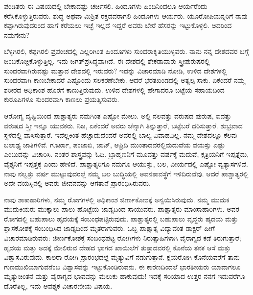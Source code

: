 ಪಂಡಿತರು ಈ ವಿಷಯದಲ್ಲಿ ಬೇಕಾದಷ್ಟು ಚರ್ಚಿಸಲಿ. ಹಿಂದೂಗಳು ಹಿಂದಿನಿಂದಲೂ ಆರ್ಯರೆಂದು ಕರೆಸಿಕೊಳ್ಳುತ್ತಿರುವರು. ಶುದ್ಧ ಅಥವಾ ಮಿಶ್ರಿತ ರಕ್ತದವರಾಗಲಿ ಹಿಂದೂಗಳು ಆರ್ಯರು. ಯೂರೋಪಿಯನ್ನರಿಗೆ ನಾವು ಕಪ್ಪಾಗಿರುವುದರಿಂದ ಹಾಗೆ ಕರೆಯಲು ಇಚ್ಛೆ ಇಲ್ಲದೆ ಇದ್ದರೆ ಅವರು ಬೇರೆ ಹೆಸರನ್ನು ಇಟ್ಟುಕೊಳ್ಳಲಿ. ಅದರಿಂದ ನಮಗೇನು?

ಬೆಳ್ಳಗಿರಲಿ, ಕಪ್ಪಗಿರಲಿ ಪ್ರಪಂಚದಲ್ಲಿ ಎಲ್ಲರಿಗಿಂತ ಹಿಂದೂಗಳು ಸುಂದರಾಕೃತಿಯುಳ್ಳ\break ವರು. ನಾನು ನನ್ನ ದೇಶದವರ ಬಗ್ಗೆ ಜಂಬಕೊಚ್ಚಿಕೊಳ್ಳುತ್ತಿಲ್ಲ. ಇದು ಜಗತ್​ಪ್ರಸಿದ್ಧವಾಗಿದೆ. ಈ ದೇಶದಲ್ಲಿ ಶೇಕಡಾವಾರು ಸ್ತ್ರೀಪುರುಷರಲ್ಲಿ ಸುಂದರವಾಗಿರುವಷ್ಟು ಮತ್ತಾವ ದೇಶದಲ್ಲಿ ಇರುವರು? ಇದನ್ನು ವಿಚಾರಮಾಡಿ ನೋಡಿ, ಉಳಿದ ದೇಶಗಳಲ್ಲಿ ಸುಂದರವಾಗಿ ಕಾಣಬೇಕಾದರೆ ಎಷ್ಟೊಂದು ಸಲಕರಣೆಬೇಕು. ಆದರೆ ಭರತಖಂಡದಲ್ಲಿ ಅತ್ಯಲ್ಪ ಸಾಕು. ಏಕೆಂದರೆ ನಮ್ಮ ಶರೀರದ ಅಧಿಕಾಂಶ ಹೊರಗೆ ಕಾಣುತ್ತಿರುವುದು. ಉಳಿದ ದೇಶಗಳಲ್ಲಿ ಹೇಗಾದರೂ ಬಟ್ಟೆಯ ಸಹಾಯದಿಂದ ಕುರೂಪಿಗಳೂ ಸುಂದರವಾಗಿ ಕಾಣಲು ಪ್ರಯತ್ನಿಸುವರು.

ಆರೋಗ್ಯ ದೃಷ್ಟಿಯಿಂದ ಪಾಶ್ಚಾತ್ಯರು ನಮಗಿಂತ ಎಷ್ಟೋ ಮೇಲು. ಅಲ್ಲಿ ನಲವತ್ತು ವರುಷದ ಪುರುಷ, ಐವತ್ತು ವರುಷದ ಸ್ತ್ರೀ ಇನ್ನೂ ಯುವಕರು. ನಿಜ, ಏಕೆಂದರೆ ಅವರು ಚೆನ್ನಾಗಿ ತಿನ್ನುತ್ತಾರೆ, ಬಟ್ಟೆಬರೆ ಧರಿಸುತ್ತಾರೆ. ಶುಭ್ರವಾದ ಸ್ಥಳದಲ್ಲಿ ವಾಸಿಸುತ್ತಾರೆ. ಇದೆಲ್ಲಕಿಂತ ಹೆಚ್ಚಾದುದೆಂದರೆ ಅವರಲ್ಲಿ ಬಾಲ್ಯ ವಿವಾಹವಿಲ್ಲ. ನಮ್ಮ ದೇಶದಲ್ಲೂ ಕೆಲವು ಬಲಾಢ್ಯ ಜಾತಿಗಳಿವೆ. ಗೂರ್ಖಾ, ಪಂಜಾಬಿ, ಜಾಟ್​, ಆಫ್ರಿದಿ ಮುಂತಾದವರಲ್ಲಿ\break ಮದುವೆಯ ವಯಸ್ಸು ಎಷ್ಟು ಎಂಬುದನ್ನು ವಿಚಾರಿಸಿ. ನಂತರ ಶಾಸ್ತ್ರವನ್ನು ಓದಿ. ಬ್ರಾಹ್ಮಣನಿಗೆ ಮೂವತ್ತು ವರ್ಷಕ್ಕೆ ಮದುವೆ, ಕ್ಷತ್ರಿಯನಿಗೆ ಇಪ್ಪತ್ತೈದು, ವೈಶ್ಯನಿಗೆ ಇಪ್ಪತ್ತಕ್ಕೆ ಎಂದು ಹೇಳಿದೆ. ಪಾಶ್ಚಾತ್ಯರಿಗೂ ನಮಗೂ ಆಯುಸ್ಸು, ಬಲ, ವೀರ್ಯದಲ್ಲಿ ಎಷ್ಟೋ ವ್ಯತ್ಯಾಸಗಳಿವೆ. ನಾವು ನಲ್ವತ್ತು ವರ್ಷ ಮುಟ್ಟುವುದರಲ್ಲೆ ನಮ್ಮ ಬಲ ಬುದ್ಧಿಯಲ್ಲಿ ಅವನತಾವಸ್ಥೆಗೆ ಇಳಿದಿರುವೆವು. ಆದರೆ ಪಾಶ್ಚಾತ್ಯರಲ್ಲಿ ಅದೇ ವಯಸ್ಸಿನಲ್ಲಿ ಅವರು ಜೀವನವನ್ನು ಆಗತಾನೆ ಪ್ರಾರಂಭಿಸಿರುವರು.

ನಾವು ಶಾಕಾಹಾರಿಗಳು, ನಮ್ಮ ರೋಗಗಳಲ್ಲಿ ಅಧಿಕಾಂಶ ಜೀರ್ಣಕೋಶಕ್ಕೆ ಅನ್ವಯಿಸಿರು\break ವುದು. ನಮ್ಮ ಮುದುಕ ಮುದುಕಿಯರು ಮುಕ್ಕಾಲು ಪಾಲು ಹೊಟ್ಟೆಯ ಜಾಡ್ಯದಿಂದ ಸಾಯುವರು. ಪಾಶ್ಚಾತ್ಯರು ಮಾಂಸಾಹಾರಿಗಳು. ಅವರ ರೋಗದಲ್ಲಿ ಬಹುಪಾಲು ಹೃದಯಕ್ಕೆ ಸಂಬಂಧಪಟ್ಟಿರುವುದು. ಪಾಶ್ಚಾತ್ಯರಲ್ಲಿ ಬಹುಪಾಲು ವೃದ್ಧರು ಹೃದಯ ಮತ್ತು ಶ್ವಾಸಕೋಶಕ್ಕೆ ಸಂಬಂಧಿಸಿದ ಜಾಡ್ಯದಿಂದ ಮೃತರಾಗುವರು. ಒಬ್ಬ ಪಾಶ್ಚಾತ್ಯ ವಿದ್ಯಾವಂತ ಡಾಕ್ಟರ್​ ಹೀಗೆ ವಿಚಾರಮಾಡಿರುವರು: ಜೀರ್ಣಕೋಶಕ್ಕೆ ಸಂಬಂಧಪಟ್ಟ ರೋಗಿಗಳು ನಿರುತ್ಸಾಹಿಗಳಾಗಿ ವೈರಾಗ್ಯದ ಕಡೆ ತಿರುಗುತ್ತಾರೆ; ಹೃದಯ ಮತ್ತು ಅದಕ್ಕೆ ಮೇಲಿರುವ ದೇಹದ ಭಾಗದ ಖಾಯಿಲೆಗೆ ತುತ್ತಾದವರಲ್ಲಿ ಕೊನೆಯ ತನಕ ಆಸೆ ಮತ್ತು ವಿಶ್ವಾಸವಿರುವುದು. ಕಾಲರಾ ರೋಗಿ ಪ್ರಾರಂಭದಲ್ಲೆ ಮೃತ್ಯುವಿಗೆ ನಡುಗುತ್ತಾನೆ. ಕ್ಷಯ\break ರೋಗಿ ಕೊನೆಯವರೆಗೆ ತಾನು ಗುಣಮುಖಿಯಾಗುವನೆಂಬ ವಿಶ್ವಾಸವನ್ನು ಇಟ್ಟು\break ಕೊಂಡಿರುವನು. ಈ ಕಾರಣದಿಂದಲೆ ಭಾರತೀಯರು ಯಾವಾಗಲೂ ಮೃತ್ಯುಚಿಂತನೆ ಮತ್ತು ವೈರಾಗ್ಯದ ಭಾವವನ್ನು ಮೆಲುಕು ಹಾಕುವುದು! ಇದಕ್ಕೆ ಸರಿಯಾದ ಉತ್ತರ ನನಗೆ ಇದುವರೆಗೂ ದೊರೆತಿಲ್ಲ, ಇದು ಆವಶ್ಯಕ ವಿಚಾರಣೀಯ ವಿಷಯ.

